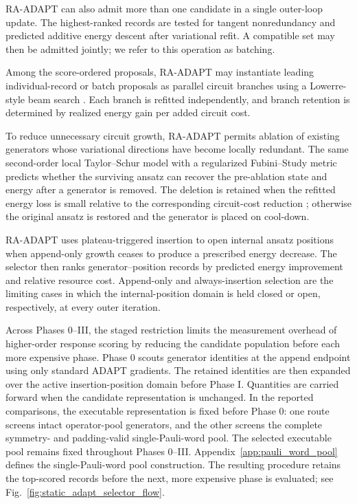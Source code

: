 \documentclass[
  reprint,
  amsmath,
  amssymb,
  aps,
  pra,
  nofootinbib,
  superscriptaddress,
  floatfix
]{revtex4-2}
\begin{document}
\textsc{RA-ADAPT} can also admit more than one candidate in a single outer-loop update. The highest-ranked records are tested for tangent nonredundancy and predicted additive energy descent after variational refit. A compatible set may then be admitted jointly; we refer to this operation as batching.

Among the score-ordered proposals, \textsc{RA-ADAPT} may instantiate leading
individual-record or batch proposals as parallel circuit branches using a
Lowerre-style beam search \cite{Lowerre1976Beam}. Each branch is refitted
independently, and branch retention is
determined by realized energy gain per added circuit cost.


To reduce unnecessary circuit growth, \textsc{RA-ADAPT} permits ablation of existing generators whose variational directions have become locally redundant. The same second-order local Taylor--Schur model with a regularized Fubini--Study metric predicts whether the surviving ansatz can recover the pre-ablation state and energy after a generator is removed. The deletion is retained when the refitted energy loss is small relative to the corresponding circuit-cost reduction \cite{Vaquero2025PrunedADAPT}; otherwise the original ansatz is restored and the generator is placed on cool-down.

\textsc{RA-ADAPT} uses plateau-triggered insertion to open internal ansatz positions when append-only growth ceases to produce a prescribed energy decrease. The selector then ranks generator--position records by predicted energy improvement and relative resource cost. Append-only and always-insertion selection are the limiting cases in which the internal-position domain is held closed or open, respectively, at every outer iteration.

Across Phases 0--III, the staged restriction limits the measurement overhead
of higher-order response scoring by reducing the candidate population before
each more expensive phase. Phase 0 scouts generator identities at
the append endpoint using only standard ADAPT gradients. The retained
identities are then expanded over the active insertion-position domain before
Phase I. Quantities are carried forward when the candidate representation is
unchanged. In the reported comparisons, the executable representation is
fixed before Phase 0: one route screens intact operator-pool generators, and
the other screens the complete symmetry- and padding-valid single-Pauli-word
pool. The selected executable pool remains fixed throughout Phases 0--III.
Appendix~\ref{app:pauli_word_pool} defines the single-Pauli-word pool
construction. The resulting procedure retains the top-scored records before the
next, more expensive phase is evaluated; see
Fig.~\ref{fig:static_adapt_selector_flow}.
\end{document}
